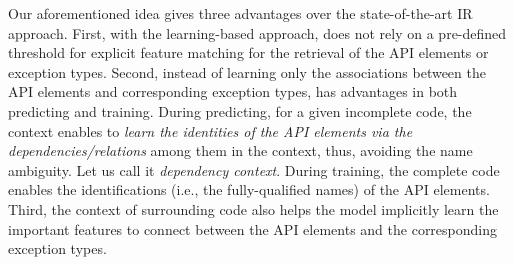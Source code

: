 
Our aforementioned idea gives {\tool} three advantages over the
state-of-the-art IR approach. First, with the learning-based approach,
{\tool} does not rely on a pre-defined threshold for explicit feature
matching for the retrieval of the API elements or exception types.
Second, instead of learning only the associations between the API
elements and corresponding exception types, {\tool} has advantages in
both predicting and training. During predicting, for a given
incomplete code, the context enables {\tool} to {\em learn the
  identities of the API elements via the dependencies/relations} among
them in the context, thus, avoiding the name ambiguity. Let us call it
{\em dependency context}. During training, the complete code enables
the identifications (i.e., the fully-qualified names) of the API
elements. Third, the context of surrounding code also helps the
model implicitly learn the important features to connect between the
API elements and the corresponding exception types.


